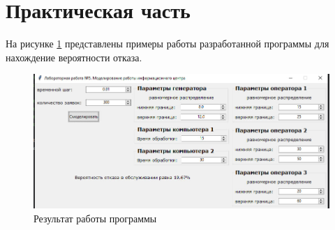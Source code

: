 \section{Практическая часть}

На рисунке \ref{img:example-1}  представлены примеры работы разработанной программы для нахождение вероятности отказа.

\begin{figure}[ht!]
	\centering
	\includegraphics[width=0.8\linewidth]{../img/res.jpg}
	\caption{Результат работы программы}
	\label{img:example-1}
\end{figure}